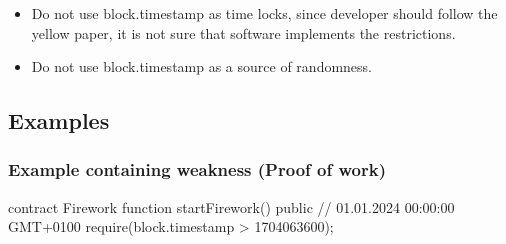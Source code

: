 % 
% 

%
%

\begin{itemize}
\item Do not use block.timestamp as time locks, since developer should follow the yellow paper, it is not sure that software implements the restrictions.
\item Do not use block.timestamp as a source of randomness.
\end{itemize}

\subsection{Examples}
\subsubsection{Example containing weakness (Proof of work)}
\begin{solidity}
contract Firework {
    function startFirework() public {
        // 01.01.2024 00:00:00 GMT+0100
        require(block.timestamp > 1704063600);
    }
}
\end{solidity}

